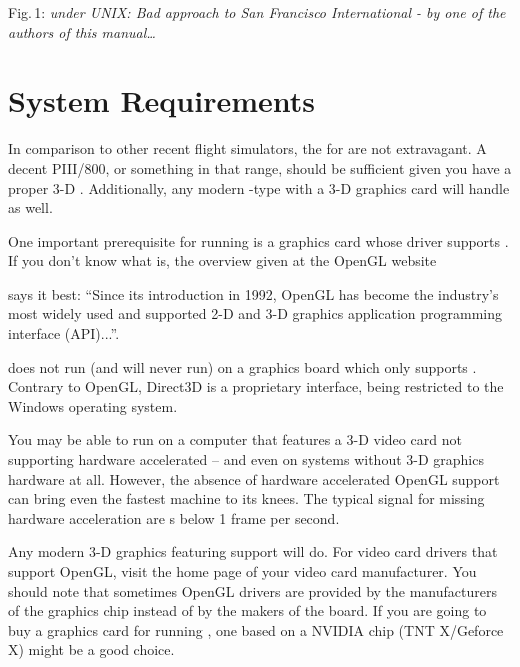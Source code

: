 \smallskip
 \noindent
Fig.\,1: \textit{\FlightGear{} under UNIX: Bad approach to San Francisco International - by one of the authors of this manual\ldots}

\section{System Requirements}
In comparison to other recent flight simulators, the  for
\FlightGear{} are not extravagant. A decent PIII/800, or something in that range, should be
sufficient given you have a proper 3-D . Additionally, any
modern -type  with a 3-D graphics card will handle
\FlightGear{} as well.

One important prerequisite for running \FlightGear{} is a graphics card whose driver supports
. If you don't know what  is, the overview given at the OpenGL website
\medskip

\medskip

\noindent
 says it best: ``Since its introduction in 1992, OpenGL has become the
industry's most widely used and supported 2-D and 3-D graphics application programming
interface (API)...''.

\FlightGear{} does not run (and will never run) on a graphics board which only supports
. Contrary to OpenGL, Direct3D is a proprietary interface, being restricted to
the Windows operating system.

You may be able to run \FlightGear{} on a computer that features a 3-D video card not
supporting hardware accelerated  -- and even on systems without 3-D
graphics hardware at all. However, the absence of hardware accelerated OpenGL support can bring even the fastest machine to its knees. The typical signal for missing hardware acceleration
are s below 1 frame per second.

Any modern 3-D graphics featuring  support will do. For
 video card drivers that support OpenGL, visit the home page of your video
card manufacturer. You should note that sometimes OpenGL drivers
are provided by the manufacturers of the graphics chip instead of by the makers of the
board. If you are going to buy a graphics card for running \FlightGear{}, one based on a
NVIDIA chip (TNT X/Geforce X) might be a good choice.

